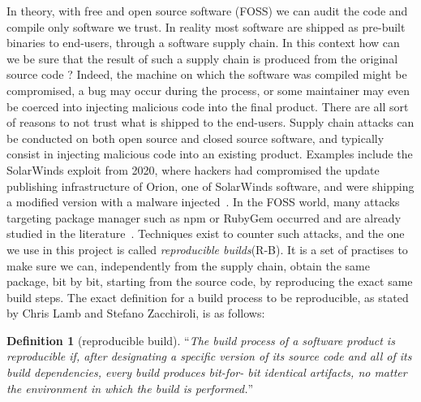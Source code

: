 \documentclass[a4paper,11pt,oneside]{report}
\theoremstyle{definition}
\newtheorem{definition}{Definition}[section]
\newcommand{\rb}{reproducible builds\xspace}
\begin{document}
In theory, with free and open source software (FOSS) we can audit the code and
compile only software we trust. In reality most software are shipped as
pre-built binaries to end-users, through a software supply chain. In this
context how can we be sure that the result of such a supply chain is produced
from the original source code ? Indeed, the machine on which the software was
compiled might be compromised, a bug may occur during the process, or some
maintainer may even be coerced into injecting malicious code into the final
product. There are all sort of reasons to not trust what is shipped to the
end-users. Supply chain attacks can be conducted on both open source and closed
source software, and typically consist in injecting malicious code into an
existing product. Examples include the SolarWinds exploit from 2020, where
hackers had compromised the update publishing infrastructure of Orion, one of
SolarWinds software, and were shipping a modified version with a malware
injected~\cite{enwiki:solarwinds}. In the FOSS world, many attacks targeting
package manager such as npm or RubyGem occurred and are already studied in the
literature~\cite{10.1007/978-3-030-52683-2_2}.
Techniques exist to counter such attacks, and the one we use in this project is
called \emph{\rb}(R-B). It is a set of practises to make sure we can, independently from
the supply chain, obtain the same package, bit by bit, starting from the source
code, by reproducing the exact same build steps. The exact definition for a
build process to be reproducible, as stated by Chris Lamb and Stefano Zacchiroli, is
as follows:

\begin{definition}[reproducible build]
\label{def:reprobuild}
``\emph{The build process of a software
product is reproducible if, after designating a
specific version of its source code and all of its
build dependencies, every build produces bit-for-
bit identical artifacts, no matter the environment
in which the build is performed.}''~\cite{DBLP:journals/corr/abs-2104-06020}
\end{definition}
\end{document}
